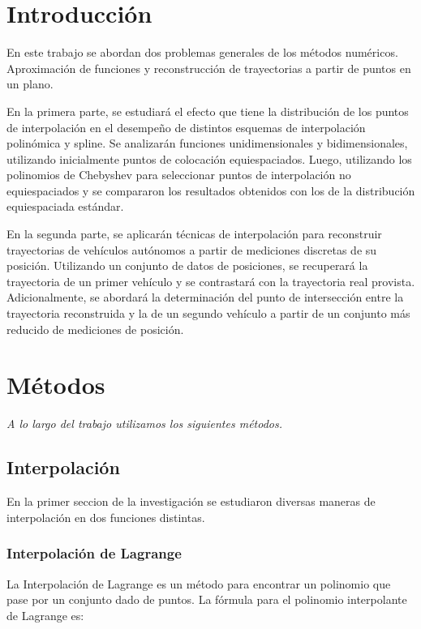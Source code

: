 \documentclass[12pt,a4]{article} %
\begin{document}
\begin{multicols}{2}
\raggedcolumns

\section{Introducción}
En este trabajo se abordan dos problemas generales de los métodos numéricos. Aproximación de funciones y reconstrucción de trayectorias a partir de puntos en un plano.

En la primera parte, se estudiará el efecto que tiene la distribución de los puntos de interpolación en el desempeño de distintos esquemas de interpolación polinómica y spline. Se analizarán funciones unidimensionales y bidimensionales, utilizando inicialmente puntos de colocación equiespaciados. Luego, utilizando los polinomios de Chebyshev para seleccionar puntos de interpolación no equiespaciados y se compararon los resultados obtenidos con los de la distribución equiespaciada estándar.

En la segunda parte, se aplicarán técnicas de interpolación para reconstruir trayectorias de vehículos autónomos a partir de mediciones discretas de su posición. Utilizando un conjunto de datos de posiciones, se recuperará la trayectoria de un primer vehículo y se contrastará con la trayectoria real provista. Adicionalmente, se abordará la determinación del punto de intersección entre la trayectoria reconstruida y la de un segundo vehículo a partir de un conjunto más reducido de mediciones de posición.



\section{Métodos}

\textit{A lo largo del trabajo utilizamos los siguientes métodos. }

\subsection{Interpolación}

En la primer seccion de la investigación se estudiaron diversas maneras de interpolación en dos funciones distintas.
\subsubsection{Interpolación de Lagrange}
La Interpolación de Lagrange es un método para encontrar un polinomio que pase por un conjunto dado de puntos. La fórmula para el polinomio interpolante de Lagrange es:


\end{multicols}
\end{document}
